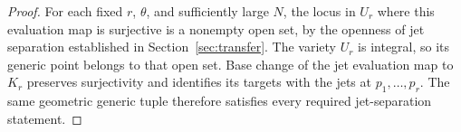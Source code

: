 \begin{proof}
For each fixed $r$, $\theta$, and sufficiently large $N$, the locus in $U_r$
where this evaluation map is surjective is a nonempty open set, by the
openness of jet separation established in Section~\ref{sec:transfer}.
The variety $U_r$ is integral, so its generic point belongs to that open set.
Base change of the jet evaluation map to $K_r$ preserves surjectivity and
identifies its targets with the jets at $p_1,\ldots,p_r$.  The same
geometric generic tuple therefore satisfies every required jet-separation
statement.
\end{proof}
